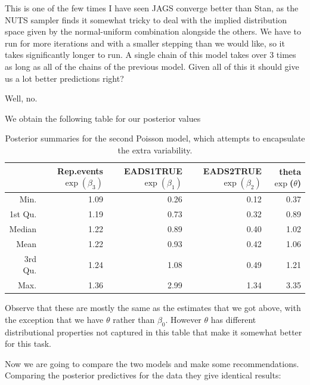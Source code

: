 \documentclass[12pt]{extarticle}
\begin{document}
This is one of the few times I have seen JAGS converge better than Stan, as the NUTS sampler finds it somewhat tricky to deal with the implied distribution space given by the normal-uniform combination alongside the others. We have to run for more iterations and with a smaller stepping than we would like, so it takes significantly longer to run. A single chain of this model takes over 3 times as long as all of the chains of the previous model. Given all of this it should give us a lot better predictions right?

Well, no.

We obtain the following table for our posterior values

\begin{table}[ht]
	\centering
	\begin{tabular}{r|rrrr}
		\hline
		& Rep.events $\exp(\beta_3)$ & EADS1TRUE $\exp(\beta_1)$ & EADS2TRUE $\exp(\beta_2)$ & theta $\exp$($\theta$) \\ 
		\hline
		Min. & 1.09 & 0.26 & 0.12 & 0.37 \\ 
		1st Qu. & 1.19 & 0.73 & 0.32 & 0.89 \\ 
		Median & 1.22 & 0.89 & 0.40 & 1.02 \\ 
		Mean & 1.22 & 0.93 & 0.42 & 1.06 \\ 
		3rd Qu. & 1.24 & 1.08 & 0.49 & 1.21 \\ 
		Max. & 1.36 & 2.99 & 1.34 & 3.35 \\ 
		\hline
	\end{tabular}
\caption{Posterior summaries for the second Poisson model, which attempts to encapsulate the extra variability.}
\label{tab:postsum_poexv}
\end{table}

Observe that these are mostly the same as the estimates that we got above, with the exception that we have $\theta$ rather than $\beta_0$. However $\theta$ has different distributional properties not captured in this table that make it somewhat better for this task. 

Now we are going to compare the two models and make some recommendations. Comparing the posterior predictives for the data they give identical results: 
\end{document}
